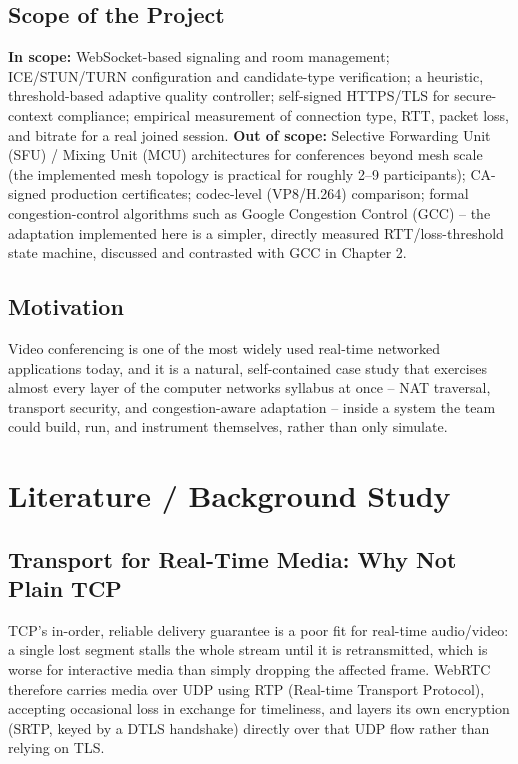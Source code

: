 \documentclass[12pt,a4paper]{report}
\begin{document}
\section{Scope of the Project}
\textbf{In scope:} WebSocket-based signaling and room management; ICE/STUN/TURN
configuration and candidate-type verification; a heuristic, threshold-based adaptive
quality controller; self-signed HTTPS/TLS for secure-context compliance; empirical
measurement of connection type, RTT, packet loss, and bitrate for a real joined session.
\textbf{Out of scope:} Selective Forwarding Unit (SFU) / Mixing Unit (MCU) architectures
for conferences beyond mesh scale (the implemented mesh topology is practical for roughly
2--9 participants); CA-signed production certificates; codec-level (VP8/H.264) comparison;
formal congestion-control algorithms such as Google Congestion Control (GCC) -- the
adaptation implemented here is a simpler, directly measured RTT/loss-threshold state
machine, discussed and contrasted with GCC in Chapter 2.

\section{Motivation}
Video conferencing is one of the most widely used real-time networked applications today,
and it is a natural, self-contained case study that exercises almost every layer of the
computer networks syllabus at once -- NAT traversal, transport security, and
congestion-aware adaptation -- inside a system the team could build, run, and instrument
themselves, rather than only simulate.

\chapter{Literature / Background Study}

\section{Transport for Real-Time Media: Why Not Plain TCP}
TCP's in-order, reliable delivery guarantee is a poor fit for real-time audio/video: a
single lost segment stalls the whole stream until it is retransmitted, which is worse for
interactive media than simply dropping the affected frame. WebRTC therefore carries media
over UDP using RTP (Real-time Transport Protocol), accepting occasional loss in exchange for
timeliness, and layers its own encryption (SRTP, keyed by a DTLS handshake) directly over
that UDP flow rather than relying on TLS.
\end{document}
